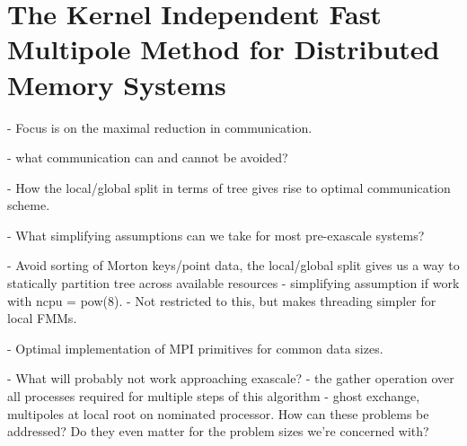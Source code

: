 \chapter{The Kernel Independent Fast Multipole Method for Distributed Memory Systems}\label{chpt:distributed_fmm}
\thispagestyle{chaptertitle} %

- Focus is on the maximal reduction in communication.

- what communication can and cannot be avoided?

- How the local/global split in terms of tree gives rise to optimal communication scheme.

- What simplifying assumptions can we take for most pre-exascale systems?

- Avoid sorting of Morton keys/point data, the local/global split gives us a way to statically partition tree across available resources - simplifying assumption if work with ncpu = pow(8).
- Not restricted to this, but makes threading simpler for local FMMs.

- Optimal implementation of MPI primitives for common data sizes.

- What will probably not work approaching exascale?
- the gather operation over all processes required for multiple steps of this algorithm - ghost exchange, multipoles at local root on nominated processor. How can these problems be addressed? Do they even matter for the problem sizes we're concerned with?

